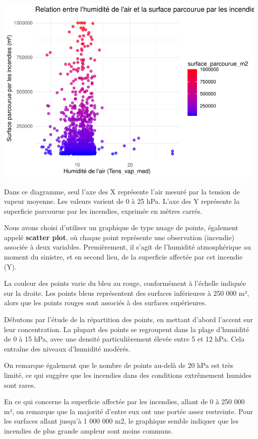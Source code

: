 \documentclass[
]{article}
\begin{document}
\includegraphics{Rapport_files/figure-latex/unnamed-chunk-2-1.pdf}

Dans ce diagramme, seul l'axe des X représente l'air mesuré par la
tension de vapeur moyenne. Les valeurs varient de 0 à 25 hPa. L'axe des
Y représente la superficie parcourue par les incendies, exprimée en
mètres carrés.

Nous avons choisi d'utiliser un graphique de type nuage de points,
également appelé \textbf{scatter plot}, où chaque point représente une
observation (incendie) associée à deux variables. Premièrement, il
s'agit de l'humidité atmosphérique au moment du sinistre, et en second
lieu, de la superficie affectée par cet incendie (Y).

La couleur des points varie du bleu au rouge, conformément à l'échelle
indiquée sur la droite. Les points bleus représentent des surfaces
inférieures à 250 000 m², alors que les points rouges sont associés à
des surfaces supérieures.

Débutons par l'étude de la répartition des points, en mettant d'abord
l'accent sur leur concentration. La plupart des points se regroupent
dans la plage d'humidité de 0 à 15 hPa, avec une densité
particulièrement élevée entre 5 et 12 hPa. Cela entraîne des niveaux
d'humidité modérés.

On remarque également que le nombre de points au-delà de 20 hPa est très
limité, ce qui suggère que les incendies dans des conditions extrêmement
humides sont rares.

En ce qui concerne la superficie affectée par les incendies, allant de 0
à 250 000 m², on remarque que la majorité d'entre eux ont une portée
assez restreinte. Pour les surfaces allant jusqu'à 1 000 000 m2, le
graphique semble indiquer que les incendies de plus grande ampleur sont
moins communs.
\end{document}
